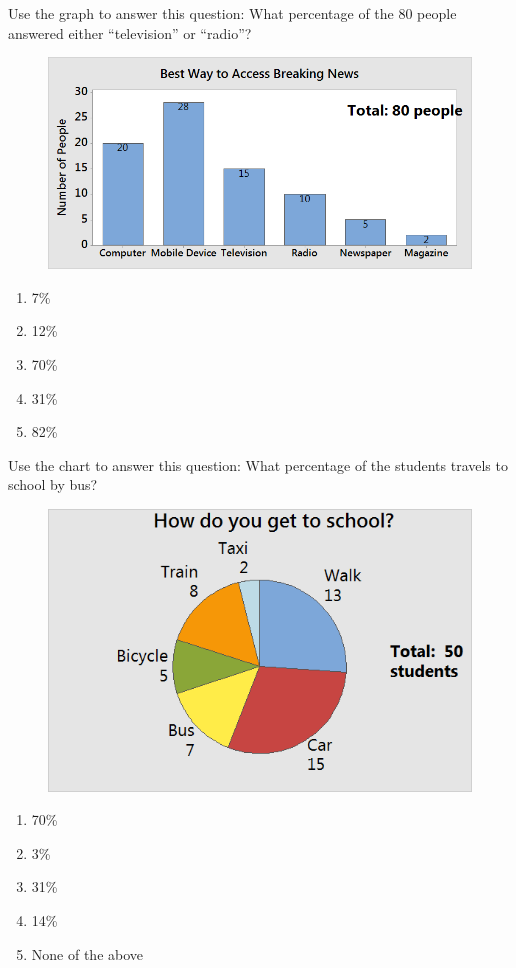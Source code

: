 \documentclass[11.5pt]{sig-alternate} %
\begin{document}
\begin{large}
Use the graph to answer this question: What percentage of the 80 people answered either “television” or “radio”?
\begin{figure}[h]
    \centering
    \includegraphics[width=0.5\linewidth]{images/q5.png}
\end{figure}
\begin{enumerate}[label=\Alph*.]
    \item 7\%
    \item 12\%
    \item 70\%
    \item 31\%
    \item 82\%
\end{enumerate}

Use the chart to answer this question: What percentage of the students travels to school by bus?
\begin{figure}[h]
    \centering
    \includegraphics[width=0.5\linewidth]{images/q7.png}
\end{figure}
\begin{enumerate}[label=\Alph*.]
    \item 70\%
    \item 3\%
    \item 31\%
    \item 14\%
    \item None of the above
\end{enumerate}


\end{large}
\end{document}

